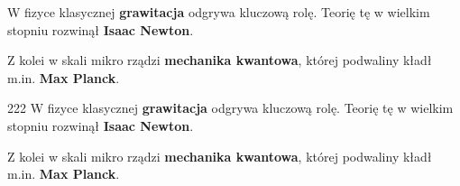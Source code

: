 
W fizyce klasycznej \textbf{grawitacja}\label{latex_test1} odgrywa kluczową rolę.
Teorię tę w wielkim stopniu rozwinął \textbf{Isaac Newton}.

Z kolei w skali mikro rządzi \textbf{mechanika kwantowa}\label{latex_test2},
której podwaliny kładł m.in. \textbf{Max Planck}.

\newpage

{}
222 W fizyce klasycznej \textbf{grawitacja}\label{latex_test3} odgrywa kluczową rolę.
Teorię tę w wielkim stopniu rozwinął \textbf{Isaac Newton}.

 Z kolei w skali mikro rządzi \textbf{mechanika kwantowa}\label{latex_test4},
której podwaliny kładł m.in. \textbf{Max Planck}.


